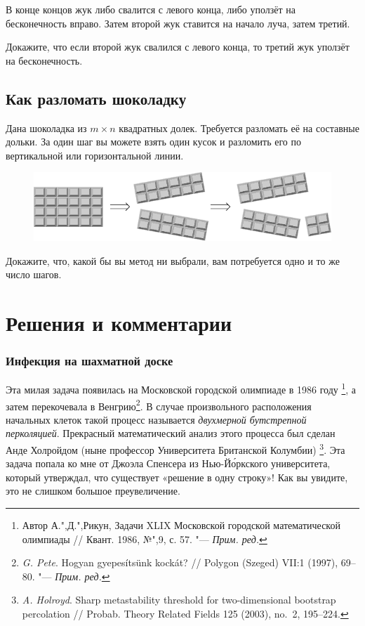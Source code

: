 \documentclass[twoside]{book}
\makeatletter
\newcommand{\rindex}[2][\imki@jobname]{%
  \index[#1]{\detokenize{#2}}%
}
\makeatother
\begin{document}
В конце концов жук либо свалится с левого конца, либо уползёт на бесконечность вправо.
Затем второй жук ставится на начало луча, затем третий.

Докажите, что если второй жук свалился с левого конца, то третий жук уползёт на бесконечность.

\subsection*{Как разломать шоколадку}%
\rindex{Как разломать шоколадку}

Дана шоколадка из $m\times n$ квадратных долек. 
Требуется разломать её на составные дольки.
За один шаг вы можете взять один кусок и разломить его по вертикальной или горизонтальной линии.

\begin{figure}[b]
\centering
\includegraphics{mp/wink-21}
\end{figure}

Докажите, что, какой бы вы метод ни выбрали, вам потребуется одно и то же  число шагов.



\section*{Решения и комментарии}

\subsubsection*{Инфекция на шахматной доске}%


Эта милая задача появилась на Московской городской олимпиаде в 1986 году%
\footnote{Автор А.",Д.",Рикун, Задачи XLIX Московской городской математической олимпиады /\!/ {Квант}. 1986, №",9, с. 57. "--- \emph{Прим. ред.}},
а затем перекочевала в Венгрию\footnote{\emph{G. Pete}. Hogyan gyepesítsünk kockát? /\!/ {Polygon (Szeged)} VII:1 (1997), 69--80. "--- \emph{Прим. ред.}}.
В случае произвольного расположения начальных клеток такой процесс называется \emph{двухмерной бутстрепной перколяцией}.
Прекрасный математический анализ этого процесса был сделан Анде Холройдом (ныне профессор Университета Британской Колумбии)%
\footnote{\emph{A. Holroyd}. Sharp metastability threshold for two-dimensional bootstrap percolation /\!/ {Probab. Theory Related Fields} 125 (2003), no.~2, 195--224.}.
Эта задача попала ко мне от Джоэла Спенсера %
из Нью-Й\'{о}ркского университета, который утверждал, что существует «решение в одну строку»!
Как вы увидите, это не слишком большое преувеличение.
\end{document}
